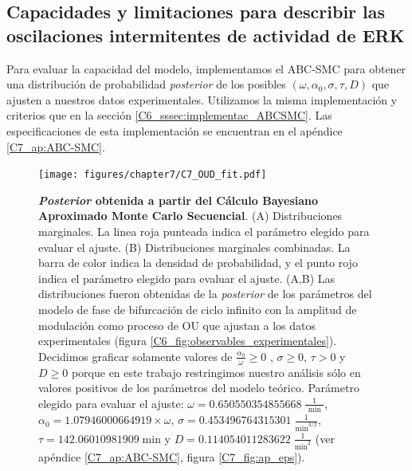 \documentclass[./main.tex]{subfiles}
\begin{document}

\subsection{Capacidades y limitaciones para describir las oscilaciones intermitentes de actividad de ERK}

Para evaluar la capacidad del modelo, implementamos el ABC-SMC para obtener una distribución de probabilidad \textit{posterior} de los posibles $(\omega,\alpha_0,\sigma,\tau,D)$ que ajusten a nuestros datos experimentales. Utilizamos la misma implementación y criterios que en la sección \ref{C6_sssec:implementac_ABCSMC}. Las especificaciones de esta implementación se encuentran en el apéndice \ref{C7_ap:ABC-SMC}.


\begin{figure}
    \centering
    \texttt{[image: figures/chapter7/C7\_OUD\_fit.pdf]} 
    \caption{\textbf{\textit{Posterior} obtenida a partir del Cálculo Bayesiano Aproximado Monte Carlo Secuencial}. (A) Distribuciones marginales. La linea roja punteada indica el parámetro elegido para evaluar el ajuste. (B) Distribuciones marginales combinadas. La barra de color indica la densidad de probabilidad, y el punto rojo indica el parámetro elegido para evaluar el ajuste. (A,B) Las distribuciones fueron obtenidas de la \textit{posterior} de los parámetros del modelo de fase de bifurcación de ciclo infinito con la amplitud de modulación como proceso de OU que ajustan a los datos experimentales (figura \ref{C6_fig:observables_experimentales}). Decidimos graficar solamente valores de $\frac{\alpha_0}{\omega} \geq 0$ , $\sigma  \geq 0$, $\tau  > 0$ y $D  \geq 0$ porque en este trabajo restringimos nuestro análisis sólo en valores positivos de los parámetros del modelo teórico. Parámetro elegido para evaluar el ajuste: $\omega = 0.650550354855668 \; \frac{1}{\text{ min }}$, $\alpha_0 = 1.07946000664919 \times \omega$, $ \sigma = 0.453496764315301 \; \frac{1}{\text{min}^{3/2}}$, $\tau = 142.06010981909 \; \text{min} $ y $D = 0.114054011283622 \; \frac{1}{\text{min}^{2}}$ (ver apéndice \ref{C7_ap:ABC-SMC}, figura \ref{C7_fig:ap_eps}).}
    \label{C7_fig:OUD_fit}
\end{figure} 
\end{document}

